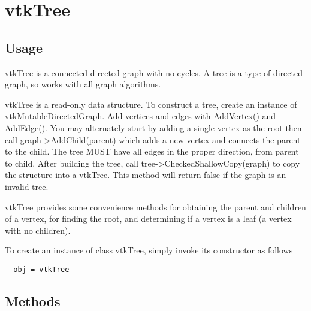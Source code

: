 \section{vtkTree}

\subsection{Usage}

 vtkTree is a connected directed graph with no cycles. A tree is a type of
 directed graph, so works with all graph algorithms.

 vtkTree is a read-only data structure.
 To construct a tree, create an instance of vtkMutableDirectedGraph.
 Add vertices and edges with AddVertex() and AddEdge(). You may alternately
 start by adding a single vertex as the root then call graph->AddChild(parent)
 which adds a new vertex and connects the parent to the child.
 The tree MUST have all edges in the proper direction, from parent to child.
 After building the tree, call tree->CheckedShallowCopy(graph) to copy the
 structure into a vtkTree. This method will return false if the graph is
 an invalid tree.

 vtkTree provides some convenience methods for obtaining the parent and
 children of a vertex, for finding the root, and determining if a vertex
 is a leaf (a vertex with no children).


To create an instance of class vtkTree, simply
invoke its constructor as follows
\begin{verbatim}
  obj = vtkTree
\end{verbatim}
\subsection{Methods}

